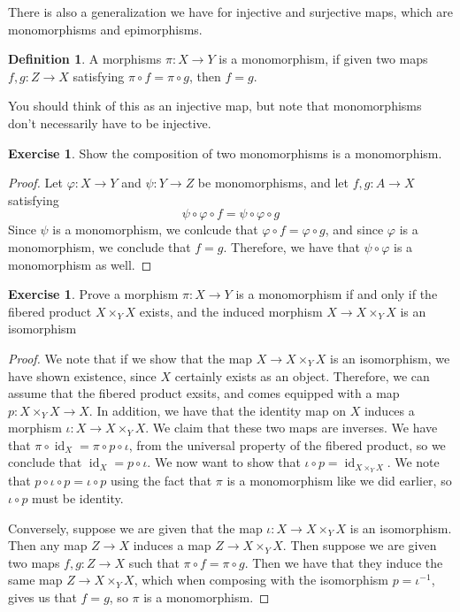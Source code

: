 \documentclass[psamsfonts]{amsart}
\theoremstyle{definition}
\newtheorem{defn}[thm]{Definition}
\newtheorem{exer}[thm]{Exercise}
\theoremstyle{remark}
\newcommand{\inv}{^{-1}}
\DeclareMathOperator{\id}{id}
\begin{document}
There is also a generalization we have for injective and surjective maps, which are monomorphisms and epimorphisms.
%
\begin{defn}
A morphisms $\pi : X \to Y$ is a monomorphism, if given two maps $f,g : Z \to X$ satisfying $\pi \circ f = \pi \circ g$, then $f = g$.
\end{defn}
%
You should think of this as an injective map, but note that monomorphisms don't necessarily have to be injective.
%
\begin{exer}
Show the composition of two monomorphisms is a monomorphism.
\end{exer}
%
\begin{proof}
Let $\varphi: X \to Y$ and $\psi : Y \to Z$ be monomorphisms, and let $f,g: A \to X$ satisfying
$$\psi \circ \varphi \circ f = \psi \circ \varphi \circ g$$
Since $\psi$ is a monomorphism, we conlcude that $\varphi \circ f = \varphi \circ g$, and since $\varphi$ is a monomorphism, we conclude that $f = g$. Therefore, we have that $\psi \circ \varphi$ is a monomorphism as well.
\end{proof}
%
\begin{exer}
Prove a morphism $\pi : X \to Y$ is a monomorphism if and only if the fibered product $X \times_Y X$ exists, and the induced morphism $X \to X \times_Y X$ is an isomorphism
\end{exer}
%
\begin{proof}
We note that if we show that the map $X \to X \times_Y X$ is an isomorphism, we have shown existence, since $X$ certainly exists as an object. Therefore, we can assume that the fibered product exsits, and comes equipped with a map $p: X \times_Y X \to X$. In addition, we have that the identity map on $X$ induces a morphism $\iota: X \to X \times_Y X$. We claim that these two maps are inverses. We have that $\pi \circ \id_X = \pi \circ p \circ \iota$, from the universal property of the fibered product, so we conclude that $\id_X = p \circ \iota$. We now want to show that $\iota \circ p= \id_{X \times_Y X}$. We note that $p \circ \iota \circ p = \iota \circ p$ using the fact that $\pi$ is a monomorphism like we did earlier, so $\iota \circ p$ must be identity.

Conversely, suppose we are given that the map $\iota : X \to X \times_Y X$ is an isomorphism. Then any map $Z \to X$ induces a map $Z \to X \times_Y X$. Then suppose we are given two maps $f,g: Z \to X$ such that $\pi \circ f = \pi \circ g$. Then we have that they induce the same map $Z \to X \times_Y X$, which when composing with the isomorphism $p = \iota\inv$, gives us that $f = g$, so $\pi$ is a monomorphism.
\end{proof}
\end{document}
